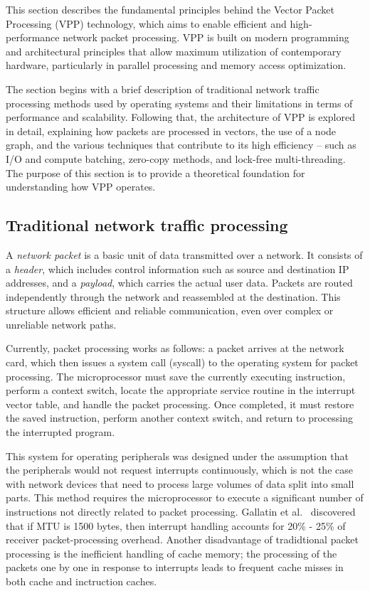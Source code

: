 This section describes the fundamental principles behind the Vector Packet Processing (VPP) technology, which aims to enable efficient and high-performance network packet processing. 
VPP is built on modern programming and architectural principles that allow maximum utilization of contemporary hardware, particularly in parallel processing and memory access optimization.

The section begins with a brief description of traditional network traffic processing methods used by operating systems and their limitations in terms of performance and scalability. 
Following that, the architecture of VPP is explored in detail, explaining how packets are processed in vectors, the use of a node graph, 
and the various techniques that contribute to its high efficiency -- such as I/O and compute batching, zero-copy methods, and lock-free multi-threading. 
The purpose of this section is to provide a theoretical foundation for understanding how VPP operates.

\subsection{Traditional network traffic processing}
A \textit{network packet} is a basic unit of data transmitted over a network. It consists of a \textit{header}, which includes control information such as source and destination IP addresses, 
and a \textit{payload}, which carries the actual user data. 
Packets are routed independently through the network and reassembled at the destination. 
This structure allows efficient and reliable communication, even over complex or unreliable network paths.

Currently, packet processing works as follows: a packet arrives at the network card, which then
issues a system call (syscall) to the operating system for packet processing. The microprocessor
must save the currently executing instruction, perform a context switch, locate the appropriate
service routine in the interrupt vector table, and handle the packet processing. Once completed, it
must restore the saved instruction, perform another context switch, and return to processing the
interrupted program.

This system for operating peripherals was designed under the assumption that the peripherals
would not request interrupts continuously, which is not the case with network devices that need
to process large volumes of data split into small parts. 
This method requires the microprocessor to execute a significant
number of instructions not directly related to packet processing. 
Gallatin et al.~\cite{gallatin1999trapeze} discovered 
that if MTU is 1500 bytes, then interrupt handling accounts for 20\% - 25\% of receiver packet-processing overhead.
Another disadvantage of tradidtional packet processing is the inefficient handling of cache memory; the processing of the packets one by one in response to
interrupts leads to frequent cache misses in both cache and inctruction caches.~\cite{cox2000profiling} 

